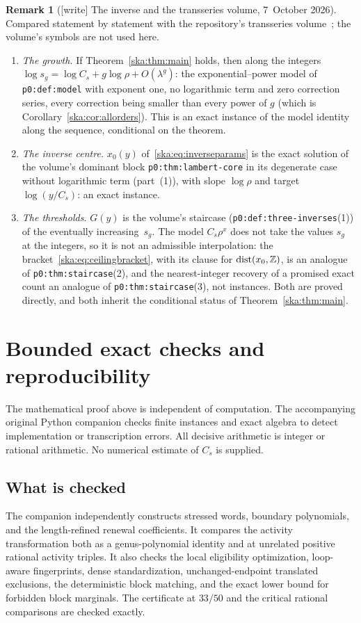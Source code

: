 \documentclass[11pt,letterpaper]{article}
\theoremstyle{definition}
\newtheorem{remark}[theorem]{Remark}
\newcommand{\dist}{\operatorname{dist}}
\newcommand{\file}[1]{\nolinkurl{#1}}
\begin{document}
\begin{remark}[{[write]} The inverse and the transseries volume, 7~October 2026]\label{ska:rem:transseries}
Compared statement by statement with the repository's transseries
volume~\cite{TSvol}; the volume's symbols are not used here.
\begin{enumerate}\raggedright
\item \emph{The growth.} If Theorem~\ref{ska:thm:main} holds, then along the
integers $\log s_g=\log C_s+g\log\rho+O(\lambda^g)$: the
exponential--power model of \file{p0:def:model} with exponent one, no
logarithmic term and zero correction series, every correction being smaller
than every power of $g$ (which is Corollary~\ref{ska:cor:allorders}). This is
an exact instance of the model identity along the sequence, conditional on
the theorem.
\item \emph{The inverse centre.} $x_0(y)$ of~\eqref{ska:eq:inverseparams} is
the exact solution of the volume's dominant block \file{p0:thm:lambert-core}
in its degenerate case without logarithmic term (part~(1)), with slope
$\log\rho$ and target $\log(y/C_s)$: an exact instance.
\item \emph{The thresholds.} $G(y)$ is the volume's staircase
(\file{p0:def:three-inverses}(1)) of the eventually increasing~$s_g$. The model
$C_s\rho^x$ does not take the values $s_g$ at the integers, so it is not an
admissible interpolation: the bracket~\eqref{ska:eq:ceilingbracket}, with its
clause for $\dist(x_0,\Z)$, is an analogue of \file{p0:thm:staircase}(2), and
the nearest-integer recovery of a promised exact count an analogue of
\file{p0:thm:staircase}(3), not instances. Both are proved directly, and both
inherit the conditional status of Theorem~\ref{ska:thm:main}.
\end{enumerate}
\end{remark}

\section{Bounded exact checks and reproducibility}\label{ska:sec:checks}
The mathematical proof above is independent of computation. The accompanying original Python companion checks finite instances and exact algebra to detect implementation or transcription errors. All decisive arithmetic is integer or rational arithmetic. No numerical estimate of $C_s$ is supplied.

\subsection{What is checked}
The companion independently constructs stressed words, boundary polynomials, and the length-refined renewal coefficients. It compares the activity transformation both as a genus-polynomial identity and at unrelated positive rational activity triples. It also checks the local eligibility optimization, loop-aware fingerprints, dense standardization, unchanged-endpoint translated exclusions, the deterministic block matching, and the exact lower bound for forbidden block marginals. The certificate at $33/50$ and the critical rational comparisons are checked exactly.
\end{document}
